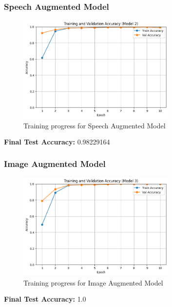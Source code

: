 \documentclass[a4paper,12pt]{article}
\begin{document}
\subsubsection{Speech Augmented Model}
\begin{figure}[H]
\centering
\includegraphics[width=0.7\textwidth]{model2_prog.png} %
\caption{Training progress for Speech Augmented Model}
\label{fig:model2_prog}
\end{figure}

\textbf{Final Test Accuracy: } 0.98229164

\subsubsection{Image Augmented Model}
\begin{figure}[H]
\centering
\includegraphics[width=0.7\textwidth]{model3_prog.png} %
\caption{Training progress for Image Augmented Model}
\label{fig:model3_prog}
\end{figure}

\textbf{Final Test Accuracy: } 1.0
\end{document}
